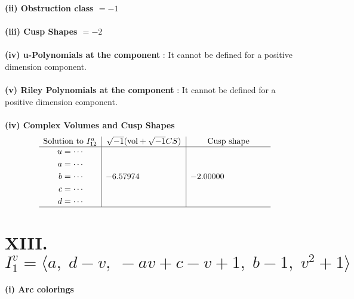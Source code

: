 \documentclass[1p]{elsarticle_modified}
\theoremstyle{definition}
\newcommand{\I}{\sqrt{-1}}
\begin{document}
\flushleft \textbf{(ii) Obstruction class $= -1$}\\~\\
\flushleft \textbf{(iii) Cusp Shapes $= -2$}\\~\\
\flushleft \textbf{(iv) u-Polynomials at the component} : It cannot be defined for a positive dimension component.\\~\\
\flushleft \textbf{(v) Riley Polynomials at the component} : It cannot be defined for a positive dimension component.\\~\\
\newpage\flushleft \textbf{(iv) Complex Volumes and Cusp Shapes}
$$\begin{array}{c|c|c} 
\text{Solution to }I^u_{12}& \I (\text{vol} + \sqrt{-1}CS) & \text{Cusp shape}\\
 \hline 
\begin{aligned}
u &= \cdots \\
a &= \cdots \\
b &= \cdots \\
c &= \cdots \\
d &= \cdots\end{aligned}
 & -6.57974\phantom{ +0.000000I} & -2.00000\phantom{ +0.000000I}\\
 \hline 
 \end{array}
$$\newpage\renewcommand{\arraystretch}{1}
\centering \section*{XIII. $I^v_{1}= \langle a,\;d- v,\;- a v+c- v+1,\;b-1,\;v^2+1 \rangle$}
\flushleft \textbf{(i) Arc colorings}\\
\end{document}
